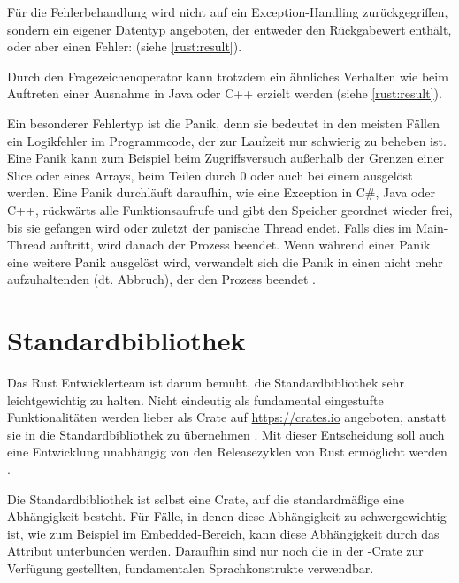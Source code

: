 Für die Fehlerbehandlung wird nicht auf ein Exception-Handling zurückgegriffen, sondern ein eigener Datentyp angeboten, der entweder den Rückgabewert enthält, oder aber einen Fehler:  (siehe \autoref{rust:result}).

Durch den Fragezeichenoperator kann trotzdem ein ähnliches Verhalten wie beim Auftreten einer Ausnahme in Java oder C++ erzielt werden (siehe \autoref{rust:result}).

\label{rust:panic}
Ein besonderer Fehlertyp ist die Panik, denn sie bedeutet in den meisten Fällen ein Logikfehler im Programmcode, der zur Laufzeit nur schwierig zu beheben ist.
Eine Panik kann zum Beispiel beim Zugriffsversuch außerhalb der Grenzen einer Slice oder eines Arrays, beim Teilen durch 0 oder auch bei einem  ausgelöst werden.
Eine Panik durchläuft daraufhin, wie eine Exception in C\#, Java oder C++, rückwärts alle Funktionsaufrufe und gibt den Speicher geordnet wieder frei, bis sie gefangen wird oder zuletzt der panische Thread endet.
Falls dies im Main-Thread auftritt, wird danach der Prozess beendet.
Wenn während einer Panik eine weitere Panik ausgelöst wird, verwandelt sich die Panik in einen nicht mehr aufzuhaltenden  (dt. Abbruch), der den Prozess beendet \cite[145-147]{rust:orly_programming}.




\section{Standardbibliothek}
\label{rust:stdlib}

Das Rust Entwicklerteam ist darum bemüht, die Standardbibliothek sehr leichtgewichtig zu halten.
Nicht eindeutig als fundamental eingestufte Funktionalitäten werden lieber als Crate auf \url{https://crates.io} angeboten, anstatt sie in die Standardbibliothek zu übernehmen . 
Mit dieser Entscheidung soll auch eine Entwicklung unabhängig von den Releasezyklen von Rust ermöglicht werden .

Die Standardbibliothek ist selbst eine Crate, auf die standardmäßige eine Abhängigkeit besteht.
Für Fälle, in denen diese Abhängigkeit zu schwergewichtig ist, wie zum Beispiel im Embedded-Bereich, kann diese Abhängigkeit durch das Attribut \rustcinline{#![no_std]} unterbunden werden.
Daraufhin sind nur noch die in der -Crate zur Verfügung gestellten, fundamentalen Sprachkonstrukte verwendbar.

